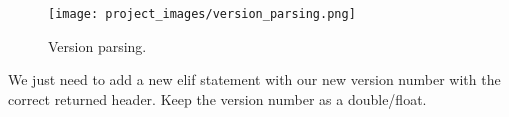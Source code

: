 \begin{figure}[H]
\centering
\texttt{[image: project\_images/version\_parsing.png]}
 \caption{Version parsing.}
 \label{fig:version parsing}
\end{figure}

We just need to add a new elif statement with our new version number with the correct returned header. Keep the version number as a double/float.




